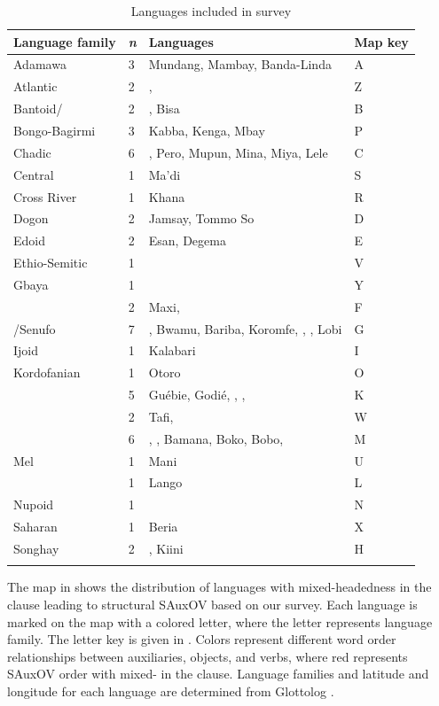 \documentclass[output=paper,newtxmath,modfonts,nonflat,draftmode]{langsci/langscibook}
\begin{document}
\begin{table}
\caption{Languages included in survey} \label{tab:sande:surveylangs} 
\begin{tabularx}{\textwidth}{llQl}
\lsptoprule
{Language family} & {\textit{n}} & {Languages} & {Map key}\\
\midrule
Adamawa & 3 & Mundang, Mambay, Banda-Linda & A\\
Atlantic & 2 & ,  & Z\\
Bantoid/ & 2 & , Bisa & B\\
Bongo-Bagirmi & 3 & Kabba, Kenga, Mbay & P\\
Chadic & 6 & , Pero, Mupun, Mina, Miya, Lele & C\\
Central  & 1 & Ma'di & S\\
Cross River & 1 & Khana & R\\
Dogon & 2 & Jamsay, Tommo So & D \\
Edoid & 2 & Esan, Degema & E\\
Ethio-Semitic & 1 &  & V\\
Gbaya & 1 &  & Y\\
 &  2 & Maxi,  & F\\
/Senufo & 7 & , Bwamu, Bariba, Koromfe, , , Lobi & G\\
Ijoid & 1 & Kalabari & I \\
Kordofanian & 1 & Otoro & O\\
 & 5 & Guébie, Godié, , ,  & K\\
 & 2 & Tafi,  & W \\
 & 6 & , , Bamana, Boko, Bobo,  & M\\
Mel & 1 & Mani & U\\
 & 1 & Lango & L\\
Nupoid & 1 &  & N \\
Saharan & 1 & Beria & X\\
Songhay & 2 & ,  Kiini & H\\
\lspbottomrule
\end{tabularx}
\end{table}


The map in  shows the distribution of languages with mixed-head\-ed\-ness in the clause leading to structural SAuxOV based on our survey. Each language is marked on the map with a colored letter, where the letter represents language family. The letter key is given in . Colors represent different word order relationships between auxiliaries, objects, and verbs, where red represents SAuxOV order with mixed- in the clause. Language families and latitude and longitude for each language are determined from Glottolog \citep{Glottolog}.
\end{document}
